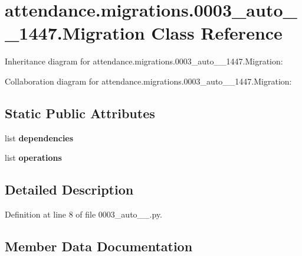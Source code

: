 \hypertarget{classattendance_1_1migrations_1_10003__auto__20160922__1447_1_1_migration}{}\section{attendance.\+migrations.0003\+\_\+auto\+\_\+\_\+1447.Migration Class Reference}
\label{classattendance_1_1migrations_1_10003__auto__20160922__1447_1_1_migration}


Inheritance diagram for attendance.\+migrations.0003\+\_\+auto\+\_\+\_\+1447.Migration\+:


Collaboration diagram for attendance.\+migrations.0003\+\_\+auto\+\_\+\_\+1447.Migration\+:
\subsection*{Static Public Attributes}
\begin{DoxyCompactItemize}
\item 
list {\bfseries dependencies}
\item 
list {\bfseries operations}
\end{DoxyCompactItemize}


\subsection{Detailed Description}


Definition at line 8 of file 0003\+\_\+auto\+\_\+\_.\+py.



\subsection{Member Data Documentation}
\hypertarget{classattendance_1_1migrations_1_10003__auto__20160922__1447_1_1_migration_a80e5f3dd5c8405f0ebb705ad2b51545c}{}\label{classattendance_1_1migrations_1_10003__auto__20160922__1447_1_1_migration_a80e5f3dd5c8405f0ebb705ad2b51545c} 
